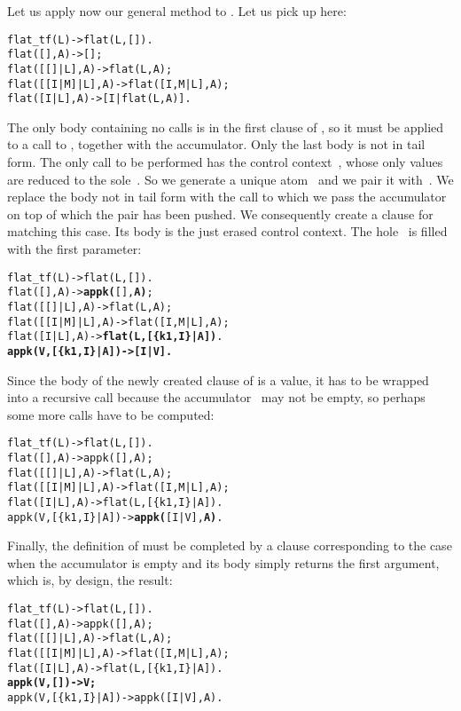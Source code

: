 Let us apply now our general method to . Let us pick
up here:
\begin{alltt}
flat_tf(L)        -> flat(L,[]).
flat(       [],A) -> [];\hfill% A \emph{unused yet}
flat(   [[]|L],A) -> flat(L,A);
flat([[I|M]|L],A) -> flat([I,M|L],A);
flat(    [I|L],A) -> [I|flat(L,A)].
\end{alltt}
The only body containing no calls is in the first clause
of , so it must be applied to a call
to , together with the accumulator. Only the last body
is not in tail form. The only call to be performed has the control
context~\erlcode{[I|\textvisiblespace]}, whose only values are reduced
to the sole~. So we generate a unique atom~ and
we pair it with~. We replace the body not in tail form with
the call to which we pass the accumulator on top of which the pair has
been pushed. We consequently create a clause for 
matching this case. Its body is the just erased control context. The
hole~\erlcode{\textvisiblespace} is filled with the first parameter:
\begin{alltt}
flat_tf(L)         -> flat(L,[]).
flat(       [],A)  -> \textbf{appk(}[],\textbf{A)};
flat(   [[]|L],A)  -> flat(L,A);
flat([[I|M]|L],A)  -> flat([I,M|L],A);
flat(    [I|L],A)  -> \textbf{flat(L,[\{k1,I\}|A])}.
\textbf{appk(V,[\{k1,I\}|A]) -> [I|V].}
\end{alltt}
Since the body of the newly created clause of  is a
value, it has to be wrapped into a recursive call because the
accumulator~ may not be empty, so perhaps some more calls
have to be computed:
\begin{alltt}
flat_tf(L)         -> flat(L,[]).
flat(       [],A)  -> appk([],A);
flat(   [[]|L],A)  -> flat(L,A);
flat([[I|M]|L],A)  -> flat([I,M|L],A);
flat(    [I|L],A)  -> flat(L,[\{k1,I\}|A]).
appk(V,[\{k1,I\}|A]) -> \textbf{appk(}[I|V],\textbf{A)}.
\end{alltt}
Finally, the definition of  must be completed by a
clause corresponding to the case when the accumulator is empty and its
body simply returns the first argument, which is, by design, the
result:
\begin{alltt}
flat_tf(L)         -> flat(L,[]).
flat(       [],A)  -> appk([],A);
flat(   [[]|L],A)  -> flat(L,A);
flat([[I|M]|L],A)  -> flat([I,M|L],A);
flat(    [I|L],A)  -> flat(L,[\{k1,I\}|A]).
\textbf{appk(V,        []) -> V;}
appk(V,[\{k1,I\}|A]) -> appk([I|V],A).
\end{alltt}
